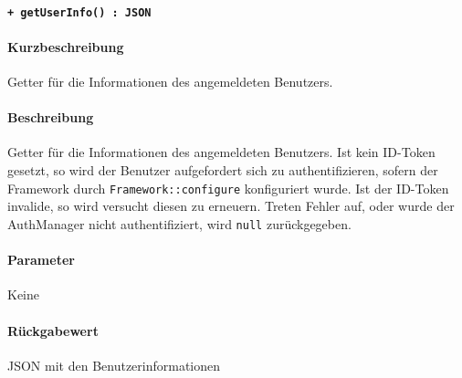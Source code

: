 \paragraph{\texttt{+ getUserInfo() : JSON}}%
\paragraph*{Kurzbeschreibung}
Getter für die Informationen des angemeldeten Benutzers.
\paragraph*{Beschreibung}
Getter für die Informationen des angemeldeten Benutzers.
Ist kein ID-Token gesetzt, so wird der Benutzer aufgefordert sich zu authentifizieren, sofern der Framework durch \verb#Framework::configure# konfiguriert wurde.
Ist der ID-Token invalide, so wird versucht diesen zu erneuern.
Treten Fehler auf, oder wurde der AuthManager nicht authentifiziert, wird \verb#null# zurückgegeben.
\paragraph*{Parameter}
Keine
\paragraph*{Rückgabewert}
JSON mit den Benutzerinformationen